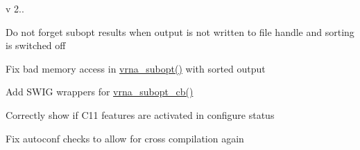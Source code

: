 v 2..
\begin{DoxyItemize}
\item Do not \textquotesingle{}forget\textquotesingle{} subopt results when output is not written to file handle and sorting is switched off
\item Fix bad memory access in \mbox{\hyperlink{group__subopt__wuchty_ga0f11d738fb8c8b1885a90c11c8931ff6}{vrna\+\_\+subopt()}} with sorted output
\item Add S\+W\+IG wrappers for \mbox{\hyperlink{group__subopt__wuchty_ga1053837e6b6f158093508f8a70998352}{vrna\+\_\+subopt\+\_\+cb()}}
\item Correctly show if C11 features are activated in configure status
\item Fix autoconf checks to allow for cross compilation again
\end{DoxyItemize}

